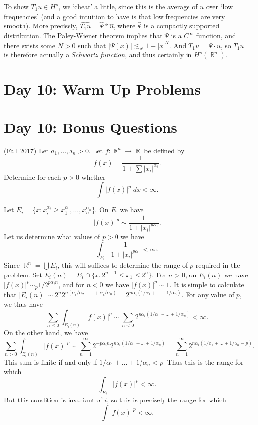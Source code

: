 \documentclass[answers]{exam}
\DeclareMathOperator{\RR}{\mathbb{R}}
\theoremstyle{problemstyle}
\newcommand{\1}[1]{\textbf{1}_{\left[#1\right]}} %
\begin{document}
\begin{questions}
\begin{solution}
    To show $T_1 u \in H^s$, we `cheat' a little, since this is the average of $u$ over `low frequencies' (and a good intuition to have is that low frequencies are very smooth). More precisely, $\widehat{T_1 u} = \widehat{\Psi} * \widehat{u}$, where $\widehat{\Psi}$ is a compactly supported distribution. The Paley-Wiener theorem implies that $\Psi$ is a $C^\infty$ function, and there exists some $N > 0$ such that $|\Psi(x)| \lesssim_N 1 + |x|^N$. And $T_1 u = \Psi \cdot u$, so $T_1 u$ is therefore actually a \emph{Schwartz function}, and thus certainly in $H^s(\RR^n)$.
\end{solution}





\newpage
\section*{Day 10: Warm Up Problems}

\newpage
\section{Day 10: Bonus Questions}

\question (Fall 2017) Let $a_1, \dots, a_n > 0$. Let $f: \RR^n \to \RR$ be defined by
%
\[ f(x) = \frac{1}{1 + \sum |x_i|^{\alpha_i}}. \]
%
Determine for each $p > 0$ whether
%
\[ \int |f(x)|^p\; dx < \infty. \]
\begin{solution}
	Let $E_i = \{ x: x_i^{\alpha_i} \geq x_1^{\alpha_1}, \dots, x_n^{\alpha_n} \}$. On $E$, we have
	\[ |f(x)|^p \sim \frac{1}{1 + |x_i|^{p \alpha_1}}. \]
	Let us determine what values of $p > 0$ we have
	\[ \int_{E_i} \frac{1}{1 + |x_i|^{p \alpha_1}} < \infty.  \]
	Since $\RR^n = \bigcup E_i$, this will suffices to determine the range of $p$ required in the problem. Set $E_i(n) = E_i \cap \{ x : 2^{n-1} \leq x_1 \leq 2^n \}$. For $n > 0$, on $E_i(n)$ we have $|f(x)|^p \sim_p 1/2^{p \alpha_i n}$, and for $n < 0$ we have $|f(x)|^p \sim 1$. It is simple to calculate that $|E_i(n)| \sim 2^n 2^{n(\alpha_i/\alpha_2 + \dots + \alpha_i / \alpha_n)} = 2^{n \alpha_i (1/\alpha_1 + \dots + 1/\alpha_n)}$. For any value of $p$, we thus have
	\[ \sum_{n \leq 0} \int_{E_i(n)} |f(x)|^p \sim \sum_{n < 0} 2^{n \alpha_i (1/\alpha_1 + \dots + 1/\alpha_n)} < \infty. \]
	On the other hand, we have
	\[ \sum_{n > 0} \int_{E_i(n)} |f(x)|^p \sim \sum_{n = 1}^\infty 2^{-p\alpha_i n} 2^{n \alpha_i(1/\alpha_1 + \dots + 1/\alpha_n)} = \sum_{n = 1}^\infty 2^{n \alpha_i(1/\alpha_1 + \dots + 1/\alpha_n -p)}. \]
	This sum is finite if and only if $1/\alpha_1 + \dots + 1/\alpha_n < p$. Thus this is the range for which
	\[ \int_{E_i} |f(x)|^p < \infty. \]
	But this condition is invariant of $i$, so this is precisely the range for which
	\[ \int |f(x)|^p < \infty. \]
\end{solution}


\end{questions}
\end{document}
